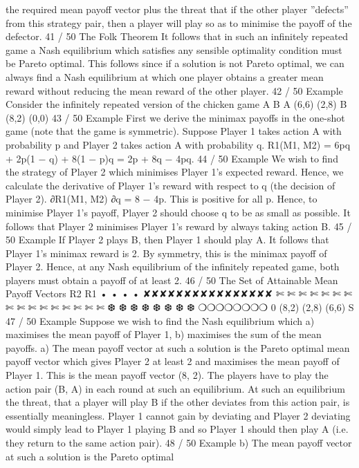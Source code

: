 \documentclass[]{report}
\begin{document}
the required mean payoff vector plus the threat that if the other
player ”defects” from this strategy pair, then a player will play so
as to minimise the payoff of the defector.
41 / 50
The Folk Theorem
It follows that in such an infinitely repeated game a Nash
equilibrium which satisfies any sensible optimality condition must
be Pareto optimal.
This follows since if a solution is not Pareto optimal, we can always
find a Nash equilibrium at which one player obtains a greater mean
reward without reducing the mean reward of the other player.
42 / 50
Example
Consider the infinitely repeated version of the chicken game
A B
A (6,6) (2,8)
B (8,2) (0,0)
43 / 50
Example
First we derive the minimax payoffs in the one-shot game (note
that the game is symmetric).
Suppose Player 1 takes action A with probability p and Player 2
takes action A with probability q.
R1(M1, M2) = 6pq + 2p(1 − q) + 8(1 − p)q = 2p + 8q − 4pq.
44 / 50
Example
We wish to find the strategy of Player 2 which minimises Player 1’s
expected reward. Hence, we calculate the derivative of Player 1’s
reward with respect to q (the decision of Player 2).
∂R1(M1, M2)
∂q
= 8 − 4p.
This is positive for all p. Hence, to minimise Player 1’s payoff,
Player 2 should choose q to be as small as possible.
It follows that Player 2 minimises Player 1’s reward by always
taking action B.
45 / 50
Example
If Player 2 plays B, then Player 1 should play A.
It follows that Player 1’s minimax reward is 2. By symmetry, this is
the minimax payoff of Player 2.
Hence, at any Nash equilibrium of the infinitely repeated game,
both players must obtain a payoff of at least 2.
46 / 50
The Set of Attainable Mean Payoff Vectors
R2
R1
•
•
•
•
✘✘✘✘✘✘✘✘✘✘✘✘✘✘✘✘
✄
✄
✄
✄
✄
✄
✄
✄
✄
✄
✄
✄
✄
✄
✄
✄
❆
❆
❆
❆
❆
❆
❆
❆
❍❍❍❍❍❍❍❍
0
(8,2)
(2,8)
(6,6)
S
47 / 50
Example
Suppose we wish to find the Nash equilibrium which a) maximises
the mean payoff of Player 1, b) maximises the sum of the mean
payoffs.
a) The mean payoff vector at such a solution is the Pareto optimal
mean payoff vector which gives Player 2 at least 2 and maximises
the mean payoff of Player 1.
This is the mean payoff vector (8, 2). The players have to play the
action pair (B, A) in each round at such an equilibrium.
At such an equilibrium the threat, that a player will play B if the
other deviates from this action pair, is essentially meaningless.
Player 1 cannot gain by deviating and Player 2 deviating would
simply lead to Player 1 playing B and so Player 1 should then play
A (i.e. they return to the same action pair).
48 / 50
Example
b) The mean payoff vector at such a solution is the Pareto optimal
\end{document}
